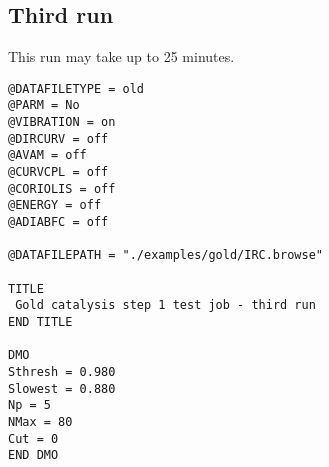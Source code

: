 \subsection{Third run}

This run may take up to 25 minutes.


\begin{tcolorbox}

\begingroup\singlespacing
\begin{verbatim}
@DATAFILETYPE = old   
@PARM = No
@VIBRATION = on
@DIRCURV = off
@AVAM = off  
@CURVCPL = off  
@CORIOLIS = off  
@ENERGY = off
@ADIABFC = off

@DATAFILEPATH = "./examples/gold/IRC.browse"

TITLE
 Gold catalysis step 1 test job - third run
END TITLE

DMO
Sthresh = 0.980
Slowest = 0.880
Np = 5
NMax = 80
Cut = 0
END DMO

\end{verbatim}
\endgroup

\end{tcolorbox}


